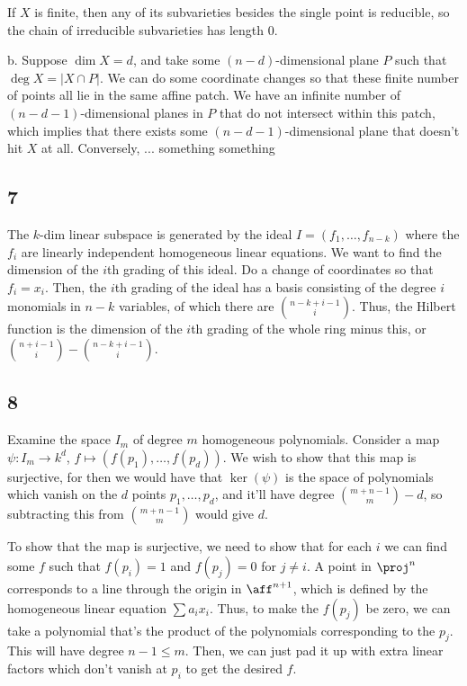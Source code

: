 \documentclass{article}
\begin{document}
If $X$ is finite, then any of its subvarieties besides the single point is reducible, so the chain of irreducible subvarieties has length $0$.

b. Suppose $\dim X=d$, and take some $(n-d)$-dimensional plane $P$ such that $\deg X=|X\cap P|$. We can do some coordinate changes so that these finite number of points all lie in the same affine patch. We have an infinite number of $(n-d-1)$-dimensional planes in $P$ that do not intersect within this patch, which implies that there exists some $(n-d-1)$-dimensional plane that doesn't hit $X$ at all. Conversely, ... something something
\subsection*{7}
The $k$-dim linear subspace is generated by the ideal $I=(f_1,\ldots,f_{n-k})$ where the $f_i$ are linearly independent homogeneous linear equations. We want to find the dimension of the $i$th grading of this ideal. Do a change of coordinates so that $f_i=x_i$. Then, the $i$th grading of the ideal has a basis consisting of the degree $i$ monomials in $n-k$ variables, of which there are $\binom{n-k+i-1}{i}$. Thus, the Hilbert function is the dimension of the $i$th grading of the whole ring minus this, or $\binom{n+i-1}{i}-\binom{n-k+i-1}{i}$.
\subsection*{8}
Examine the space $I_m$ of degree $m$ homogeneous polynomials. Consider a map $\psi:I_m\to k^d$, $f\mapsto (f(p_1),\ldots,f(p_d))$. We wish to show that this map is surjective, for then we would have that $\ker(\psi)$ is the space of polynomials which vanish on the $d$ points $p_1,\ldots,p_d$, and it'll have degree $\binom{m+n-1}{m}-d$, so subtracting this from $\binom{m+n-1}{m}$ would give $d$.

To show that the map is surjective, we need to show that for each $i$ we can find some $f$ such that $f(p_i)=1$ and $f(p_j)=0$ for $j\neq i$. A point in $\proj^n$ corresponds to a line through the origin in $\aff^{n+1}$, which is defined by the homogeneous linear equation $\sum a_ix_i$. Thus, to make the $f(p_j)$ be zero, we can take a polynomial that's the product of the polynomials corresponding to the $p_j$. This will have degree $n-1\leq m$. Then, we can just pad it up with extra linear factors which don't vanish at $p_i$ to get the desired $f$.
\end{document}
